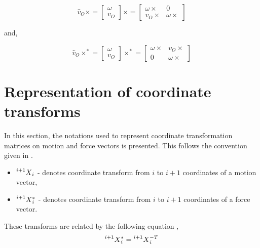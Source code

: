 	\begin{equation}
	\label{eq:cross1}
		\hat v_O \times = \begin{bmatrix}
			\omega \\ v_O
		\end{bmatrix} \times = \begin{bmatrix}
			\omega \times & 0 \\
			v_O \times & \omega \times
		\end{bmatrix}
	\end{equation}
	
	and,
	
	\begin{equation}
	\label{eq:cross2}
	\hat v_O \times^* = \begin{bmatrix}
	\omega \\ v_O
	\end{bmatrix} \times^* = \begin{bmatrix}
	\omega \times & v_O \times \\
	0 & \omega \times
	\end{bmatrix}
	\end{equation}
	
\chapter{Representation of coordinate transforms}\label{chap:coordinate}	

In this section, the notations used to represent coordinate transformation matrices on motion and force vectors is presented. This follows the convention given in \cite{featherstone2014rigid}.

\begin{itemize}
	\item $\prescript{i+1}{}{X}_i$ - denotes coordinate transform from $i$ to $i+1$ coordinates of a motion vector,
	\item $\prescript{i+1}{}{X}_i^*$ - denotes coordinate transform from $i$ to $i+1$ coordinates of a force vector.
\end{itemize}

These transforms are related by the following equation \cite{featherstone2014rigid},
$$ \prescript{i+1}{}{X}_i^* = \prescript{i+1}{}{X}_i^{-T}$$
